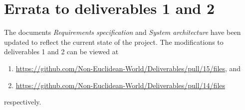 \section{Errata to deliverables 1 and 2}
The documents \textit{Requirements specification} and \textit{System architecture} have been updated to reflect the current state of the project.
The modifications to deliverables 1 and 2 can be viewed at
\begin{enumerate}
    \item \url{https://github.com/Non-Euclidean-World/Deliverables/pull/15/files}, and
    \item \url{https://github.com/Non-Euclidean-World/Deliverables/pull/14/files}
\end{enumerate}
respectively.